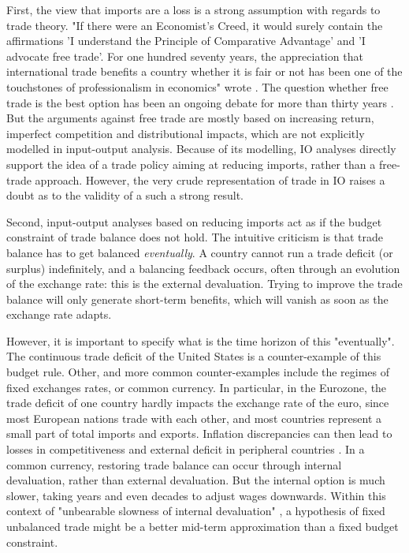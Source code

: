 First, the view that imports are a loss is a strong assumption with regards to trade theory. "If there were an Economist's Creed, it would surely contain the affirmations 'I understand the Principle of Comparative Advantage' and 'I advocate free trade'. For one hundred seventy years, the appreciation that international trade benefits a country whether it is fair or not has been one of the touchstones of professionalism in economics" wrote \citet{Krugman1987}.
The question whether free trade is the best option has been an ongoing debate for more than thirty years \citep{Krugman1987}. But the arguments against free trade are mostly based on increasing return, imperfect competition and distributional impacts, which are not explicitly modelled in input-output analysis. 
Because of its modelling, IO analyses directly support the idea of a trade policy aiming at reducing imports, rather than a free-trade approach. However, the very crude representation of trade in IO raises a doubt as to the validity of a such a strong result.

Second, input-output analyses based on reducing imports act as if the budget constraint of trade balance does not hold.
The intuitive criticism is that trade balance has to get balanced \textit{eventually}. A country cannot run a trade deficit (or surplus) indefinitely, and a balancing feedback occurs, often through an evolution of the exchange rate: this is the external devaluation. 
Trying to improve the trade balance will only generate short-term benefits, which will vanish as soon as the exchange rate adapts.

However, it is important to specify what is the time horizon of this "eventually". 
The continuous trade deficit of the United States is a counter-example of this budget rule. Other, and more common counter-examples include the regimes of fixed exchanges rates, or common currency.
In particular, in the Eurozone, the trade deficit of one country hardly impacts the exchange rate of the euro, since most European nations trade with each other, and most countries represent a small part of total imports and exports. Inflation discrepancies can then lead to losses in competitiveness and external deficit in peripheral countries \citep{Coudert2013}. In a common currency, restoring trade balance can occur through internal devaluation, rather than external devaluation. But the internal option is much slower, taking years and even decades to adjust wages downwards. 
Within this context of "unbearable slowness of internal devaluation" \citep{Krugman2012}, a hypothesis of fixed unbalanced trade might be a better mid-term approximation than a fixed budget constraint.

